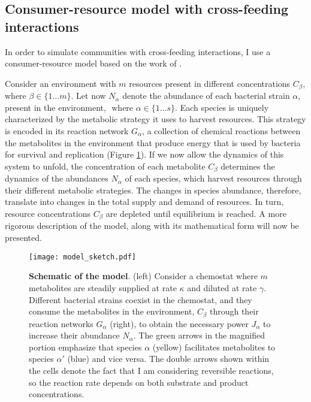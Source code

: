 \documentclass[titlepage,11pt]{article}
\begin{document}
\begin{linenumbers}
			\subsection{Consumer-resource model with cross-feeding interactions}
				\hspace{15pt}In order to simulate communities with cross-feeding interactions, I use a consumer-resource model based on the work of \citet{Marsland2019}.\par 
				Consider an environment with $ m $ resources present in different concentrations $ C_{\beta} $, where $ \beta \in \{1 \dots m\} $. Let now $ N_{\alpha} $ denote the abundance of each bacterial strain $ \alpha $,  present in the environment, $ \text{ where } \alpha \in \{1 \dots s\} $. Each species is uniquely characterized by the metabolic strategy it uses to harvest resources. This strategy is encoded in its reaction network $ G_{\alpha} $, a collection of chemical reactions between the metabolites in the environment that produce energy that is used by bacteria for survival and replication (Figure \ref{fig:model}). If we now allow the dynamics of this system to unfold, the concentration of each metabolite $ C_\beta $ determines the dynamics of the abundances $ N_\alpha$ of each species, which harvest resources through their different metabolic strategies. The changes in species abundance, therefore, translate into changes in the total supply and demand of resources. In turn,  resource concentrations $ C_{\beta} $ are depleted until equilibrium is reached. A more rigorous description of the model, along with its mathematical form will now be presented.\par 
				\begin{figure}
					\centering
					\texttt{[image: model\_sketch.pdf]}
					\caption{\textbf{Schematic of the model}. (left) Consider a chemostat where $ m $ metabolites are steadily supplied at rate $ \kappa $ and diluted at rate $ \gamma $. Different bacterial strains coexist in the chemostat, and they consume the metabolites in the environment, $ C_{\beta} $ through their reaction networks $ G_{\alpha} $ (right), to obtain the necessary power $ J_{\alpha} $ to increase their abundance $ N_{\alpha} $. The green arrows in the magnified portion emphasize that species $ \alpha $ (yellow) facilitates metabolites to species $ \alpha' $ (blue) and vice versa. The double arrows shown within the cells denote the fact that I am considering reversible reactions, so the reaction rate depends on both substrate and product concentrations.}
					\label{fig:model}

\end{figure}
\end{linenumbers}
\end{document}
